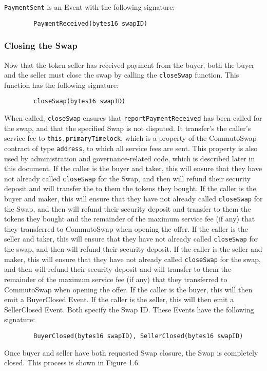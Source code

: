 \documentclass[11pt]{article}
\begin{document}
    \verb|PaymentSent| is an Event with the following signature:
    \begin{verbatim}
        PaymentReceived(bytes16 swapID)
    \end{verbatim}

    \subsubsection*{Closing the Swap}

    Now that the token seller has received payment from the buyer, both the buyer and the seller
    must close the swap by calling the \verb|closeSwap| function.
    This function has the following signature:
    \begin{verbatim}
        closeSwap(bytes16 swapID)
    \end{verbatim}

    When called, \verb|closeSwap| ensures that \verb|reportPaymentReceived| has been called for the
    swap, and that the specified Swap is not disputed.
    It transfer's the caller's service fee to \verb|this.primaryTimelock|, which is a property of
    the CommutoSwap contract of type \verb|address|, to which all service fees are sent.
    This property is also used by administration and governance-related code, which is described
    later in this document.
    If the caller is the buyer and taker, this will ensure that they have not already called
    \verb|closeSwap| for the Swap, and then will refund their security deposit and will transfer the
    to them the tokens they bought.
    If the caller is the buyer and maker, this will ensure that they have not already called
    \verb|closeSwap| for the Swap, and then will refund their security deposit and transfer to them
    the tokens they bought and the remainder of the maximum service fee (if any) that they
    transferred to CommutoSwap when opening the offer.
    If the caller is the seller and taker, this will ensure that they have not already called
    \verb|closeSwap| for the swap, and then will refund their security deposit.
    If the caller is the seller and maker, this will ensure that they have not already called
    \verb|closeSwap| for the swap, and then will refund their security deposit and will transfer to
    them the remainder of the maximum service fee (if any) that they transferred to CommutoSwap when
    opening the offer.
    If the caller is the buyer, this will then emit a BuyerClosed Event.
    If the caller is the seller, this will then emit a SellerClosed Event.
    Both specify the Swap ID\@.
    These Events have the following signature:
    \begin{verbatim}
        BuyerClosed(bytes16 swapID), SellerClosed(bytes16 swapID)
    \end{verbatim}
    Once buyer and seller have both requested Swap closure, the Swap is completely closed.
    This process is shown in Figure 1.6.
\end{document}
